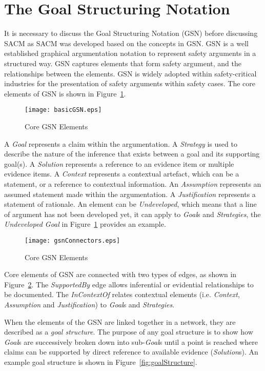 \section{The Goal Structuring Notation}
\label{gsn}
It is necessary to discuss the Goal Structuring Notation (GSN) before discussing SACM as SACM was developed based on the concepts in GSN. GSN is a well established graphical argumentation notation to represent safety arguments in a structured way. GSN captures elements that form safety argument, and the relationships between the elements. GSN is widely adopted within safety-critical industries for the presentation of safety arguments within safety cases. The core elements of GSN is shown in Figure~\ref{fig:gsnCore}.

\begin{figure}
	\centering
	\texttt{[image: basicGSN.eps]}
	\caption{Core GSN Elements}
	\label{fig:gsnCore}
\end{figure}

A \textit{Goal} represents a claim within the argumentation. A \textit{Strategy} is used to describe the nature of the inference that exists between a goal and its supporting goal(s). A \textit{Solution} represents a reference to an evidence item or multiple evidence items. A \textit{Context} represents a contextual artefact, which can be a statement, or a reference to contextual information. An \textit{Assumption} represents an assumed statement made within the argumentation. A \textit{Justification} represents a statement of rationale. An element can be \textit{Undeveloped}, which means that a line of argument has not been developed yet, it can apply to \textit{Goal}s and \textit{Strategies}, the \textit{Undeveloped Goal} in Figure~\ref{fig:gsnCore} provides an example. 

\begin{figure}
	\centering
	\texttt{[image: gsnConnectors.eps]}
	\caption{Core GSN Elements}
	\label{fig:gsnEdges}
\end{figure}

Core elements of GSN are connected with two types of edges, as shown in Figure~\ref{fig:gsnEdges}. The \textit{SupportedBy} edge allows inferential or evidential relationships to be documented. The \textit{InContextOf} relates contextual elements (i.e. \textit{Context}, \textit{Assumption} and \textit{Justification}) to \textit{Goal}s and \textit{Strategies}.

When the elements of the GSN are linked together in a network, they are described as a \textit{goal structure}. The purpose of any goal structure is to show how \textit{Goal}s are successively broken down into sub-\textit{Goal}s until a point is reached where claims can be supported by direct reference to available evidence (\textit{Solution}s). An example goal structure is shown in Figure~\ref{fig:goalStructure}.

